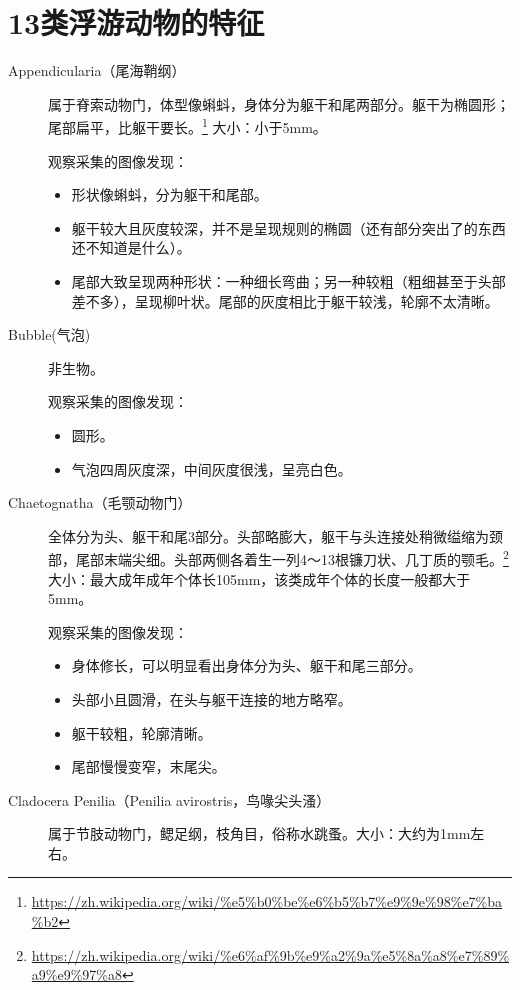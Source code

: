 \section{13类浮游动物的特征}
\begin{description}
    \item[Appendicularia（尾海鞘纲）] 属于脊索动物门，体型像蝌蚪，身体分为躯干和尾两部分。躯干为椭圆形；尾部扁平，比躯干要长。\footnote{\url{https://zh.wikipedia.org/wiki/\%e5\%b0\%be\%e6\%b5\%b7\%e9\%9e\%98\%e7\%ba\%b2}} 大小：小于5mm。
    
    观察采集的图像发现：
    \begin{itemize}
        \item 形状像蝌蚪，分为躯干和尾部。
        \item 躯干较大且灰度较深，并不是呈现规则的椭圆（还有部分突出了的东西还不知道是什么）。
        \item 尾部大致呈现两种形状：一种细长弯曲；另一种较粗（粗细甚至于头部差不多），呈现柳叶状。尾部的灰度相比于躯干较浅，轮廓不太清晰。
    \end{itemize}
    \item[Bubble(气泡)] 非生物。
    
    观察采集的图像发现：
        \begin{itemize}
        \item 圆形。
        \item 气泡四周灰度深，中间灰度很浅，呈亮白色。
        \end{itemize}
    \item[Chaetognatha（毛颚动物门）] 全体分为头、躯干和尾3部分。头部略膨大，躯干与头连接处稍微缢缩为颈部，尾部末端尖细。头部两侧各着生一列4～13根镰刀状、几丁质的颚毛。\footnote{\url{https://zh.wikipedia.org/wiki/\%e6\%af\%9b\%e9\%a2\%9a\%e5\%8a\%a8\%e7\%89\%a9\%e9\%97\%a8}}大小：最大成年成年个体长105mm，该类成年个体的长度一般都大于5mm。
    
    观察采集的图像发现：
        \begin{itemize}
        \item 身体修长，可以明显看出身体分为头、躯干和尾三部分。
        \item 头部小且圆滑，在头与躯干连接的地方略窄。
        \item 躯干较粗，轮廓清晰。
        \item 尾部慢慢变窄，末尾尖。
        \end{itemize}
    \item[{\color{blue}Cladocera Penilia（Penilia avirostris，鸟喙尖头溞）}] 属于节肢动物门，鳃足纲，枝角目，俗称水跳蚤。大小：大约为1mm左右。
    

\end{description}
